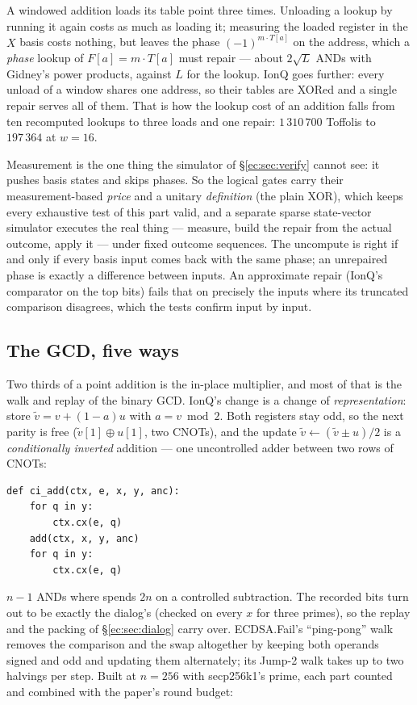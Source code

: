 \documentclass[11pt]{article}
\theoremstyle{plain}
\theoremstyle{remark}
\begin{document}
A windowed addition loads its table point three times. Unloading a lookup by running it again costs
as much as loading it; measuring the loaded register in the $X$ basis costs nothing, but leaves the
phase $(-1)^{m\cdot T[a]}$ on the address, which a \emph{phase} lookup of $F[a]=m\cdot T[a]$ must
repair --- about $2\sqrt L$ ANDs with Gidney's power products, against $L$ for the lookup. IonQ
goes further: every unload of a window shares one address, so their tables are XORed and a single
repair serves all of them. That is how the lookup cost of an addition falls from ten recomputed
lookups to three loads and one repair: $1\,310\,700$ Toffolis to $197\,364$ at $w=16$.

Measurement is the one thing the simulator of \S\ref{ec:sec:verify} cannot see: it pushes basis
states and skips phases. So the logical gates carry their measurement-based \emph{price} and a
unitary \emph{definition} (the plain XOR), which keeps every exhaustive test of this part valid, and
a separate sparse state-vector simulator executes the real thing --- measure, build the repair from
the actual outcome, apply it --- under fixed outcome sequences. The uncompute is right if and only
if every basis input comes back with the same phase; an unrepaired phase is exactly a difference
between inputs. An approximate repair (IonQ's comparator on the top bits) fails that on precisely
the inputs where its truncated comparison disagrees, which the tests confirm input by input.

\subsection{The GCD, five ways}

Two thirds of a point addition is the in-place multiplier, and most of that is the walk and replay
of the binary GCD. IonQ's change is a change of \emph{representation}: store $\tilde v=v+(1-a)u$ with
$a=v\bmod2$. Both registers stay odd, so the next parity is free ($\tilde v[1]\oplus u[1]$, two
CNOTs), and the update $\tilde v\leftarrow(\tilde v\pm u)/2$ is a \emph{conditionally inverted}
addition --- one uncontrolled adder between two rows of CNOTs:
\begin{lstlisting}
def ci_add(ctx, e, x, y, anc):
    for q in y:
        ctx.cx(e, q)
    add(ctx, x, y, anc)
    for q in y:
        ctx.cx(e, q)
\end{lstlisting}
\noindent $n-1$ ANDs where \cite{ec:schrott26} spends $2n$ on a controlled subtraction. The recorded
bits turn out to be exactly the dialog's (checked on every $x$ for three primes), so the replay and
the packing of \S\ref{ec:sec:dialog} carry over. ECDSA.Fail's ``ping-pong'' walk removes the comparison
and the swap altogether by keeping both operands signed and odd and updating them alternately; its
Jump-2 walk takes up to two halvings per step. Built at $n=256$ with secp256k1's prime, each part
counted and combined with the paper's round budget:
\end{document}
